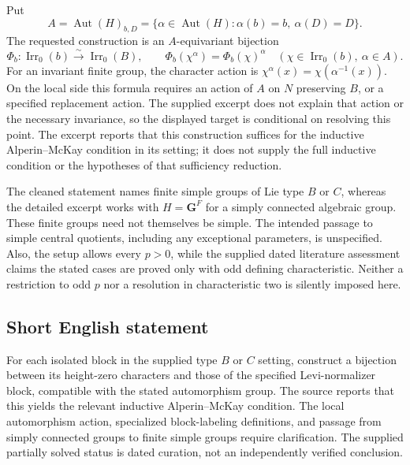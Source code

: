 \documentclass[11pt]{article}
\begin{document}
Put
\[
A=\operatorname{Aut}(H)_{b,D}
 =\{\alpha\in\operatorname{Aut}(H):\alpha(b)=b,\ \alpha(D)=D\}.
\]
The requested construction is an \(A\)-equivariant bijection
\[
\Phi_b:\operatorname{Irr}_0(b)\xrightarrow{\sim}\operatorname{Irr}_0(B),
\qquad
\Phi_b(\chi^\alpha)=\Phi_b(\chi)^\alpha
\quad(\chi\in\operatorname{Irr}_0(b),\ \alpha\in A).
\]
For an invariant finite group, the character action is \(\chi^\alpha(x)=\chi(\alpha^{-1}(x))\). On the local side this formula requires an action of \(A\) on \(N\) preserving \(B\), or a specified replacement action. The supplied excerpt does not explain that action or the necessary invariance, so the displayed target is conditional on resolving this point. The excerpt reports that this construction suffices for the inductive Alperin--McKay condition in its setting; it does not supply the full inductive condition or the hypotheses of that sufficiency reduction.

The cleaned statement names finite simple groups of Lie type \(B\) or \(C\), whereas the detailed excerpt works with \(H=\mathbf G^F\) for a simply connected algebraic group. These finite groups need not themselves be simple. The intended passage to simple central quotients, including any exceptional parameters, is unspecified. Also, the setup allows every \(p>0\), while the supplied dated literature assessment claims the stated cases are proved only with odd defining characteristic. Neither a restriction to odd \(p\) nor a resolution in characteristic two is silently imposed here.
\subsection{Short English statement}
For each isolated block in the supplied type \(B\) or \(C\) setting, construct a bijection between its height-zero characters and those of the specified Levi-normalizer block, compatible with the stated automorphism group. The source reports that this yields the relevant inductive Alperin--McKay condition. The local automorphism action, specialized block-labeling definitions, and passage from simply connected groups to finite simple groups require clarification. The supplied partially solved status is dated curation, not an independently verified conclusion.
\end{document}
